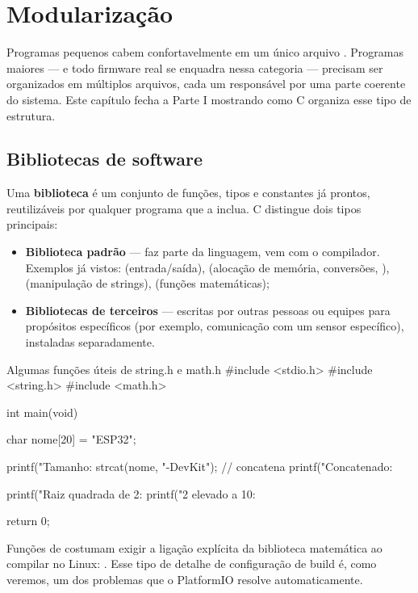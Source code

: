 \chapter{Modularização}
\label{cap:modularizacao}

Programas pequenos cabem confortavelmente em um único arquivo . Programas maiores — e todo firmware real se enquadra nessa categoria — precisam ser organizados em múltiplos arquivos, cada um responsável por uma parte coerente do sistema. Este capítulo fecha a Parte I mostrando como C organiza esse tipo de estrutura.

\section{Bibliotecas de software}

Uma \textbf{biblioteca} é um conjunto de funções, tipos e constantes já prontos, reutilizáveis por qualquer programa que a inclua. C distingue dois tipos principais:

\begin{itemize}
    \item \textbf{Biblioteca padrão} — faz parte da linguagem, vem com o compilador. Exemplos já vistos:  (entrada/saída),  (alocação de memória, conversões, ),  (manipulação de strings),  (funções matemáticas);
    \item \textbf{Bibliotecas de terceiros} — escritas por outras pessoas ou equipes para propósitos específicos (por exemplo, comunicação com um sensor específico), instaladas separadamente.
\end{itemize}

\begin{codigoc}{Algumas funções úteis de string.h e math.h}
#include <stdio.h>
#include <string.h>
#include <math.h>

int main(void) {
    char nome[20] = "ESP32";

    printf("Tamanho: %
    strcat(nome, "-DevKit");                     // concatena
    printf("Concatenado: %

    printf("Raiz quadrada de 2: %
    printf("2 elevado a 10: %

    return 0;
}
\end{codigoc}

\begin{atencao}
Funções de  costumam exigir a ligação explícita da biblioteca matemática ao compilar no Linux: . Esse tipo de detalhe de configuração de build é, como veremos, um dos problemas que o PlatformIO resolve automaticamente.
\end{atencao}

